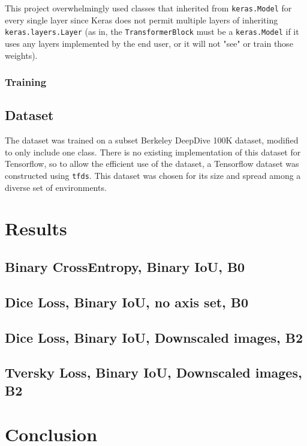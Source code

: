 \documentclass[12pt]{article}
\begin{document}
    This project overwhelmingly used classes that inherited from \texttt{keras.Model} for every single layer since Keras does not permit multiple layers of inheriting \texttt{keras.layers.Layer} (as in, the \texttt{TransformerBlock} must be a \texttt{keras.Model} if it uses any layers implemented by the end user, or it will not "see" or train those weights).

    \subsubsection*{Training}

    \subsection*{Dataset}

    The dataset was trained on a subset Berkeley DeepDive 100K dataset, modified to only include one class. There is no existing implementation of this dataset for Tensorflow, so to allow the efficient use of the dataset, a Tensorflow dataset was constructed using \texttt{tfds}. This dataset was chosen for its size and spread among a diverse set of environments.

    \section{Results}

    \subsection*{Binary CrossEntropy, Binary IoU, B0}

    \subsection*{Dice Loss, Binary IoU, no axis set, B0}

    \subsection*{Dice Loss, Binary IoU, Downscaled images, B2}

    \subsection*{Tversky Loss, Binary IoU, Downscaled images, B2}

    \section{Conclusion}

    \newpage
    
\end{document}
